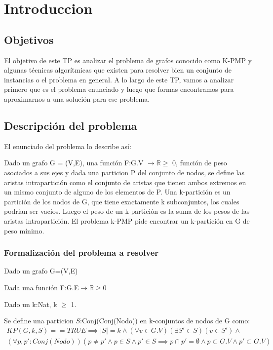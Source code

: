 \section{Introduccion}

\subsection{Objetivos}

El objetivo de este TP es analizar el problema de grafos conocido como K-PMP y algunas t\'ecnicas algor\'itmicas que existen para resolver bien un conjunto de instancias o el problema en general.
A lo largo de este TP, vamos a analizar primero que es el problema enunciado y luego que formas encontramos para aproximarnos a una soluci\'on para ese problema.

\subsection{Descripci\'on del problema}

El enunciado del problema lo describe as\'i:

Dado un grafo G = (V,E), una funci\'on F:G.V $\rightarrow \mathbb{R} \geq$ 0, funci\'on de peso asociados a sus ejes y dada una particion P del conjunto de nodos, se define las aristas intrapartici\'on como el conjunto de aristas que tienen ambos extremos en un mismo conjunto de alguno de los elementos de P.
Una k-partici\'on es un partici\'on de los nodos de G, que tiene exactamente k subconjuntos, los cuales podrian ser vacios. Luego el peso de un k-partici\'on es la suma de los pesos de las aristas intrapartici\'on.
El problema k-PMP pide encontrar un k-partici\'on en G de peso m\'inimo.

\subsubsection{Formalizaci\'on del problema a resolver}


Dado un grafo G=(V,E)

Dada una funci\'on F:G.E$\rightarrow$$\mathbb{R} \geq 0$

Dado un k:Nat, k $\geq$ 1.

Se define una particion $S$:Conj(Conj(Nodo)) en k-conjuntos de nodos de G como:
\begin{align*}
KP(G,k,S)==TRUE \implies
|S|=k \wedge (\forall v \in G.V)(\exists S'\in S)(v \in S') \wedge \\
(\forall p,p':Conj(Nodo))(p \neq p' \wedge p \in S \wedge p' \in S \implies p \cap p' = \emptyset \wedge p \subset G.V \wedge p' \subset G.V)   
\end{align*}

